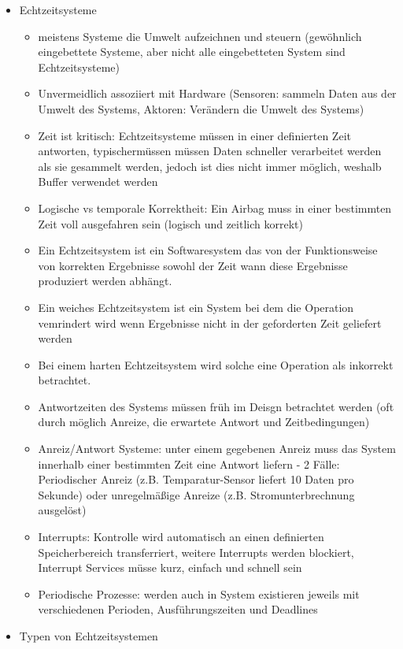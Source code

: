\documentclass[paper=a4, fontsize=11pt]{scrartcl} %
\numberwithin{equation}{section} %
\numberwithin{figure}{section} %
\numberwithin{table}{section} %
\begin{document}
\begin{itemize}
  \item Echtzeitsysteme
  \begin{itemize}
    \item meistens Systeme die Umwelt aufzeichnen und steuern (gewöhnlich eingebettete Systeme, aber nicht alle eingebetteten System sind Echtzeitsysteme)
    \item Unvermeidlich assoziiert mit Hardware (Sensoren: sammeln Daten aus der Umwelt des Systems, Aktoren: Verändern die Umwelt des Systems)
    \item Zeit ist kritisch: Echtzeitsysteme müssen in einer definierten Zeit antworten, typischermüssen müssen Daten schneller verarbeitet werden als sie gesammelt werden, jedoch ist dies nicht immer möglich, weshalb Buffer verwendet werden
    \item Logische vs temporale Korrektheit: Ein Airbag muss in einer bestimmten Zeit voll ausgefahren sein (logisch und zeitlich korrekt)
    \item Ein Echtzeitsystem ist ein Softwaresystem das von der Funktionsweise von korrekten Ergebnisse sowohl der Zeit wann diese Ergebnisse produziert werden abhängt.
    \item Ein weiches Echtzeitsystem ist ein System bei dem die Operation vemrindert wird wenn Ergebnisse nicht in der geforderten Zeit geliefert werden
    \item Bei einem harten Echtzeitsystem wird solche eine Operation als inkorrekt betrachtet.
    \item Antwortzeiten des Systems müssen früh im Deisgn betrachtet werden (oft durch möglich Anreize, die erwartete Antwort und Zeitbedingungen)
    \item Anreiz/Antwort Systeme: unter einem gegebenen Anreiz muss das System innerhalb einer bestimmten Zeit eine Antwort liefern - 2 Fälle: Periodischer Anreiz (z.B. Temparatur-Sensor liefert 10 Daten pro Sekunde) oder unregelmäßige Anreize (z.B. Stromunterbrechnung ausgelöst)
    \item Interrupts: Kontrolle wird automatisch an einen definierten Speicherbereich transferriert, weitere Interrupts werden blockiert, Interrupt Services müsse kurz, einfach und schnell sein
    \item Periodische Prozesse: werden auch in System existieren jeweils mit verschiedenen Perioden, Ausführungszeiten und Deadlines
  \end{itemize}
  \item Typen von Echtzeitsystemen

\end{itemize}
\end{document}
